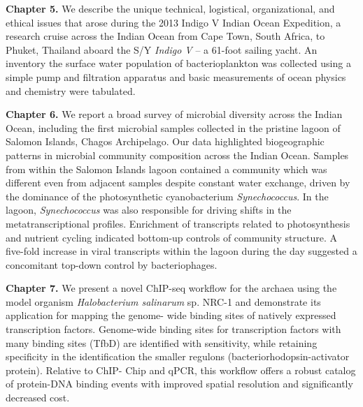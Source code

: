 \noindent\textbf{Chapter 5.} We describe the unique technical,
logistical, organizational, and ethical issues that arose during the 2013
Indigo V Indian Ocean Expedition, a research cruise across the Indian Ocean
from Cape Town, South Africa, to Phuket, Thailand aboard the S/Y {\em Indigo
V} -- a 61-foot sailing yacht. An inventory the surface water population of
bacterioplankton was collected using a simple pump and filtration apparatus
and basic measurements of ocean physics and chemistry were
tabulated.

\noindent\textbf{Chapter 6.} We report a broad survey of
microbial diversity across the Indian Ocean, including the first microbial
samples collected in the pristine lagoon of Salomon Islands, Chagos
Archipelago. Our data highlighted biogeographic
patterns in microbial community composition across the Indian Ocean. Samples
from within the Salomon Islands lagoon contained a community which was
different even from adjacent samples despite constant water exchange, driven
by the dominance of the photosynthetic cyanobacterium {\em Synechococcus}. In
the lagoon, {\em Synechococcus} was also responsible for driving shifts in the
metatranscriptional profiles. Enrichment of transcripts related to
photosynthesis and nutrient cycling indicated bottom-up controls of community
structure. A five-fold increase in viral transcripts within the lagoon
during the day suggested a concomitant top-down control by bacteriophages.


\noindent\textbf{Chapter 7.} We present a novel ChIP-seq
workflow for the archaea using the model organism {\em Halobacterium
salinarum} sp. NRC-1 and demonstrate its application for mapping the genome-
wide binding sites of natively expressed transcription factors. Genome-wide
binding sites for transcription factors with many binding sites (TfbD) are
identified with sensitivity, while retaining specificity in the identification
the smaller regulons (bacteriorhodopsin-activator protein). Relative to ChIP-
Chip and qPCR, this workflow offers a robust catalog of protein-DNA binding
events with improved spatial resolution and significantly decreased cost.

